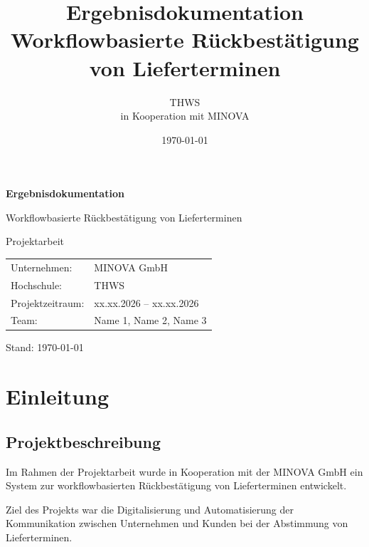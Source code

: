 \documentclass[
12pt,
a4paper
]{article}
\title{
\Huge Ergebnisdokumentation\\[0.5cm]
\Large Workflowbasierte Rückbestätigung von Lieferterminen
}
\author{
THWS \\[0.2cm]
in Kooperation mit MINOVA
}
\date{\today}
\begin{document}

\begin{titlepage}
\centering

\vspace*{3cm}

{\Huge\bfseries Ergebnisdokumentation\par}

\vspace{1cm}

{\LARGE Workflowbasierte Rückbestätigung von Lieferterminen\par}

\vspace{2cm}

{\Large Projektarbeit\par}

\vspace{1cm}

\begin{tabular}{ll}
Unternehmen: & MINOVA GmbH \\
Hochschule: & THWS \\
Projektzeitraum: & xx.xx.2026 -- xx.xx.2026 \\
Team: & Name 1, Name 2, Name 3 \\
\end{tabular}

\vfill

Stand: \today

\end{titlepage}

\tableofcontents
\newpage

\section{Einleitung}

\subsection{Projektbeschreibung}

Im Rahmen der Projektarbeit wurde in Kooperation mit der
MINOVA GmbH ein System zur workflowbasierten Rückbestätigung
von Lieferterminen entwickelt.

Ziel des Projekts war die Digitalisierung und Automatisierung
der Kommunikation zwischen Unternehmen und Kunden bei der
Abstimmung von Lieferterminen.
\end{document}
